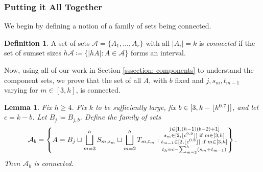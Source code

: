 \documentclass{daj}
\newtheorem{lemma}[theorem]{Lemma}
\theoremstyle{definition}
\newtheorem{definition}[theorem]{Definition}
\theoremstyle{remark}
\numberwithin{equation}{section}
\numberwithin{theorem}{section}
\newcommand{\cala}{\mathcal{A}}
\DeclarePairedDelimiter{\floor}{\lfloor}{\rfloor}
\begin{document}
\subsubsection{Putting it All Together}\label{sssection: finish}
We begin by defining a notion of a family of sets being connected.
\begin{definition}
    A set of sets $\cala = \{A_1,\ldots,A_r\}$ with all $|A_i| = k$ is \emph{connected} if the set of sumset sizes $h\cala \coloneq  \{|hA|:A \in \cala\}$ forms an interval.
\end{definition}
Now, using all of our work in Section \ref{sssection: components} to understand the component sets, we prove that the set of all $A$, with $b$ fixed and $j,s_m,t_{m-1}$ varying for $m \in [3,h]$, is connected.
\begin{lemma}\label{lemmaAb}
    Fix $h \geq 4$. Fix $k$ to be sufficiently large, fix $b \in [3,k-\floor{k^{0.7}}]$, and let $c = k-b$. Let $B_j\coloneq B_{j,b}$. Define the family of sets \[\cala_b = \left\{A = B_j \sqcup \bigsqcup_{m=3}^h S_{m,s_m} \sqcup \bigsqcup_{m=2}^h T_{m,t_m}:\substack{j \in [1,(h-1)(b-2)+1] \\ s_m \in [2,\floor{c^{0.9}}] \textnormal{ if }m \in [3,h] \\ t_{m-1} \in [2,\floor{c^{0.8}}]\textnormal{ if } m \in [3,h] \\
    t_h = c-\sum_{m=3}^h(s_m+t_{m-1})} 
    \right\}.\] Then $\cala_b$ is connected.
\end{lemma}
\end{document}
